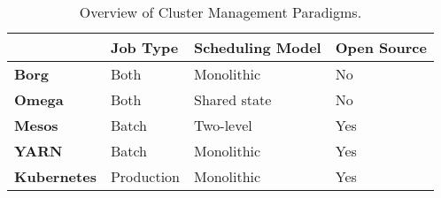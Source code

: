 
\begin{table}[]
\centering
\caption{Overview of Cluster Management
Paradigms.}\label{table:cluster-management-paradigms-comparison-table}
\begin{tabular}{|l|l|l|l|}
\hline
                    & \textbf{Job Type} & \textbf{Scheduling Model} &
                      \textbf{Open Source} \\ \hline
\textbf{Borg \cite{borg}}       & Both              & Monolithic                & No
\\ \hline
\textbf{Omega \cite{omega}}      & Both              & Shared state              & No
\\ \hline
\textbf{Mesos \cite{mesos}}      & Batch             & Two-level                 & Yes
\\ \hline
\textbf{YARN \cite{yarn}}       & Batch             & Monolithic                & Yes
\\ \hline
\textbf{Kubernetes \cite{k8s-website}} & Production        & Monolithic                & Yes
\\ \hline
\end{tabular}
\end{table}

